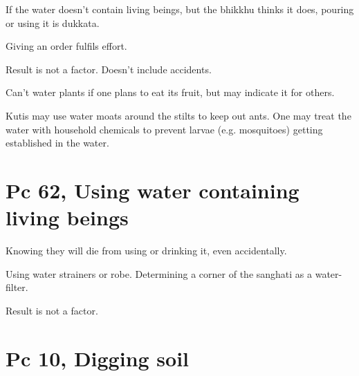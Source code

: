 If the water doesn't contain living beings, but the bhikkhu thinks it
does, pouring or using it is dukkata.

Giving an order fulfils effort.

Result is not a factor. Doesn't include accidents.

Can't water plants if one plans to eat its fruit, but may indicate it
for others.

Kutis may use water moats around the stilts to keep out ants. One may
treat the water with household chemicals to prevent larvae (e.g.
mosquitoes) getting established in the water.

\section{Pc 62, Using water containing living beings}

\enlargethispage{\baselineskip}

Knowing they will die from using or drinking it, even accidentally.

Using water strainers or robe. Determining a corner of the sanghati as a
water-filter.

Result is not a factor.

\clearpage

\section{Pc 10, Digging soil}

